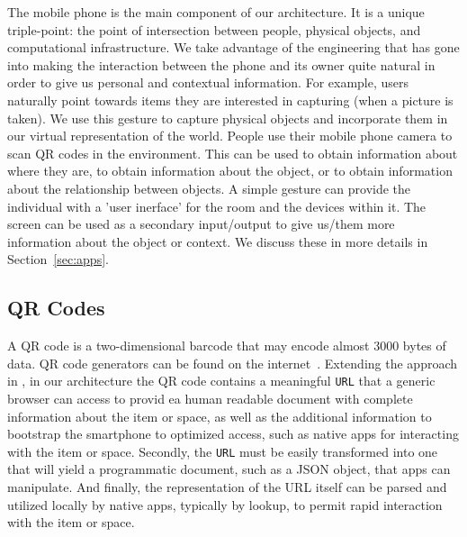 The mobile phone is the main component of our architecture.  It is a unique triple-point: the point of intersection
between people, physical objects, and computational infrastructure.  We take advantage of the engineering that has gone 
into making the interaction between the phone and its owner quite natural in order to give us personal and contextual
information.  For example, users naturally point towards items they are interested in capturing (when a picture is taken).
We use this gesture to capture physical objects and incorporate them in our virtual representation of the world.
People use their mobile phone camera to scan QR codes in the environment.  This can be used to obtain information
about where they are, to obtain information about the object, or to obtain information about the relationship
between objects. A simple gesture can provide the individual with a 'user
inerface' for the room and the devices within it.
\cite{Enabling ``Smart Spaces:'' Entity Description and User Interface Generation for a Heterogeneous Component-based Distributed System 
T. D. Hodes, R. H. Katz, DARPA/NIST Smart Spaces Workshop, 
Gaithersburg, Maryland, July 1998. 
UC Berkeley Technical Report CSD/98/1008}
The screen can be used as a secondary input/output to give us/them more information about the 
object or context.  We discuss these in more details in Section~\ref{sec:apps}.

\subsection{QR Codes}
\label{sec:qrc}

A QR code is a two-dimensional barcode that may encode almost 3000 bytes of data.  QR code generators
can be found on the internet~\cite{qrcgen1, qrcgen2}.  
Extending the approach in \cite{hbci}, in
our
architecture the QR code contains a meaningful {\tt URL} that a
generic browser can access to provid ea human readable document with complete
information about the item or space, as well as the additional
information to bootstrap the smartphone to optimized access, such as
native apps for interacting with the item or space.  Secondly, the 
{\tt URL}  must be easily transformed into one that will yield a
programmatic document, such as a JSON object, that apps can
manipulate.  And finally, the representation of the URL itself can be
parsed and utilized locally by native apps, typically by lookup, to
permit rapid interaction with the item or space.


